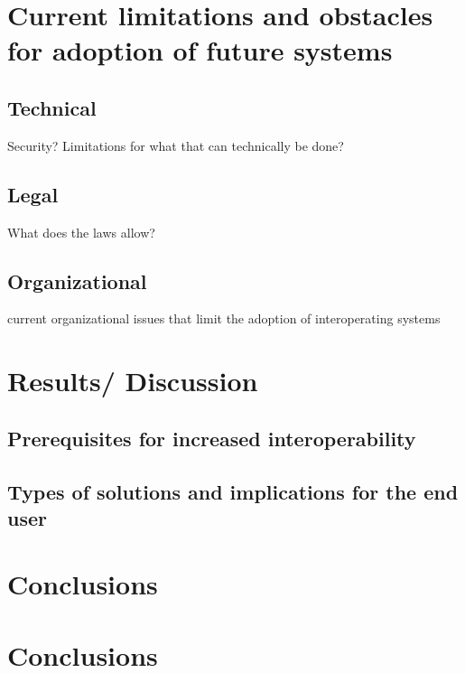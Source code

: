 \documentclass[12pt]{article}
\begin{document}
\section{Current limitations and obstacles for adoption of future systems}

\subsection{Technical}
Security? Limitations for what that can technically be done?

\subsection{Legal}
What does the laws allow?

\subsection{Organizational}
current organizational issues that limit the adoption of interoperating systems

\section{Results/ Discussion}

\subsection{ Prerequisites for increased interoperability}

\subsection{Types of solutions and implications for the end user}

\section{Conclusions}

\section{Conclusions}

\newpage
\begin{appendix}


\end{appendix}

\newpage
 
 
\end{document}
